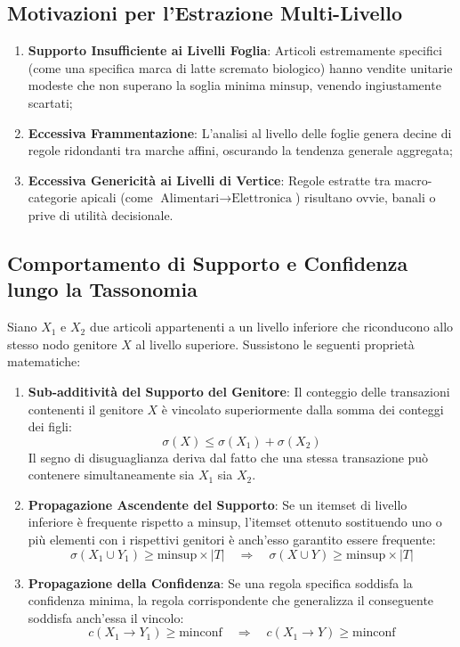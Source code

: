 \subsection{Motivazioni per l'Estrazione Multi-Livello}
\begin{enumerate}
    \item \textbf{Supporto Insufficiente ai Livelli Foglia}: Articoli estremamente specifici (come una specifica marca di latte scremato biologico) hanno vendite unitarie modeste che non superano la soglia minima $\mathrm{minsup}$, venendo ingiustamente scartati;
    \item \textbf{Eccessiva Frammentazione}: L'analisi al livello delle foglie genera decine di regole ridondanti tra marche affini, oscurando la tendenza generale aggregata;
    \item \textbf{Eccessiva Genericità ai Livelli di Vertice}: Regole estratte tra macro-categorie apicali (come $\text{Alimentari} \rightarrow \text{Elettronica}$) risultano ovvie, banali o prive di utilità decisionale.
\end{enumerate}

\FloatBarrier
\subsection{Comportamento di Supporto e Confidenza lungo la Tassonomia}
Siano $X_1$ e $X_2$ due articoli appartenenti a un livello inferiore che riconducono allo stesso nodo genitore $X$ al livello superiore. Sussistono le seguenti proprietà matematiche:
\begin{enumerate}
    \item \textbf{Sub-additività del Supporto del Genitore}: Il conteggio delle transazioni contenenti il genitore $X$ è vincolato superiormente dalla somma dei conteggi dei figli:
    \begin{equation}
    \sigma(X) \le \sigma(X_1) + \sigma(X_2)
    \end{equation}
    Il segno di disuguaglianza deriva dal fatto che una stessa transazione può contenere simultaneamente sia $X_1$ sia $X_2$.
    \item \textbf{Propagazione Ascendente del Supporto}: Se un itemset di livello inferiore è frequente rispetto a $\mathrm{minsup}$, l'itemset ottenuto sostituendo uno o più elementi con i rispettivi genitori è anch'esso garantito essere frequente:
    \begin{equation}
    \sigma(X_1 \cup Y_1) \ge \mathrm{minsup} \times |T| \quad \Longrightarrow \quad \sigma(X \cup Y) \ge \mathrm{minsup} \times |T|
    \end{equation}
    \item \textbf{Propagazione della Confidenza}: Se una regola specifica soddisfa la confidenza minima, la regola corrispondente che generalizza il conseguente soddisfa anch'essa il vincolo:
    \begin{equation}
    c(X_1 \longrightarrow Y_1) \ge \mathrm{minconf} \quad \Longrightarrow \quad c(X_1 \longrightarrow Y) \ge \mathrm{minconf}
    \end{equation}
\end{enumerate}

